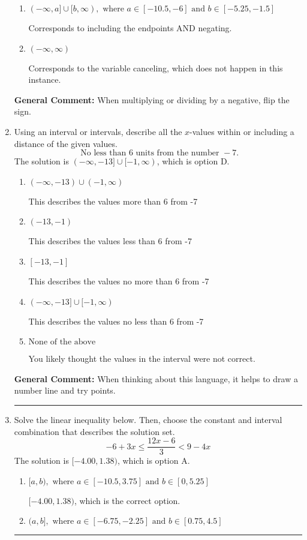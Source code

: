 \documentclass{extbook}[14pt]
\newcommand{\litem}[1]{\item #1

\rule{\textwidth}{0.4pt}}
\begin{document}
\begin{enumerate}
{\begin{enumerate}[label=\Alph*.]
 * Correct option.
\item \( (-\infty, a] \cup [b, \infty), \text{ where } a \in [-10.5, -6] \text{ and } b \in [-5.25, -1.5] \)

Corresponds to including the endpoints AND negating.
\item \( (-\infty, \infty) \)

Corresponds to the variable canceling, which does not happen in this instance.
\end{enumerate}

\textbf{General Comment:} When multiplying or dividing by a negative, flip the sign.
}
\litem{
Using an interval or intervals, describe all the $x$-values within or including a distance of the given values.
\[ \text{ No less than } 6 \text{ units from the number } -7. \]The solution is \( (-\infty, -13] \cup [-1, \infty) \), which is option D.\begin{enumerate}[label=\Alph*.]
\item \( (-\infty, -13) \cup (-1, \infty) \)

This describes the values more than 6 from -7
\item \( (-13, -1) \)

This describes the values less than 6 from -7
\item \( [-13, -1] \)

This describes the values no more than 6 from -7
\item \( (-\infty, -13] \cup [-1, \infty) \)

This describes the values no less than 6 from -7
\item \( \text{None of the above} \)

You likely thought the values in the interval were not correct.
\end{enumerate}

\textbf{General Comment:} When thinking about this language, it helps to draw a number line and try points.
}
\litem{
Solve the linear inequality below. Then, choose the constant and interval combination that describes the solution set.
\[ -6 + 3 x \leq \frac{12 x - 6}{3} < 9 - 4 x \]The solution is \( [-4.00, 1.38) \), which is option A.\begin{enumerate}[label=\Alph*.]
\item \( [a, b), \text{ where } a \in [-10.5, 3.75] \text{ and } b \in [0, 5.25] \)

$[-4.00, 1.38)$, which is the correct option.
\item \( (a, b], \text{ where } a \in [-6.75, -2.25] \text{ and } b \in [0.75, 4.5] \)


\end{enumerate}}
\end{enumerate}
\end{document}
